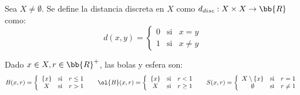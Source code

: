 \begin{ejemplo}
    Sea $X\neq \emptyset$. Se define la distancia discreta en $X$ como $d_{disc}:X\times X\to \bb{R}$ como:
    \begin{equation*}
        d(x,y)=\left\{
            \begin{array}{ccc}
                0 & \text{si} & x=y \\
                1 & \text{si} & x\neq y
            \end{array}
        \right.
    \end{equation*}

    Dado $x\in X, r\in \bb{R}^+$, las bolas y esfera son:
    \begin{equation*}
        B(x,r)=\left\{
            \begin{array}{ccc}
                \{x\} & \text{si} & r \leq 1 \\
                X & \text{si} & r > 1
            \end{array}
        \right.
        \hspace{0.5cm}
        \ol{B}(x,r)=\left\{
            \begin{array}{ccc}
                \{x\} & \text{si} & r < 1 \\
                X & \text{si} & r \geq 1
            \end{array}
        \right.
        \hspace{0.5cm}
        S(x,r)=\left\{
            \begin{array}{ccc}
                X\setminus \{x\} & \text{si} & r = 1 \\
                \emptyset & \text{si} & r \neq 1
            \end{array}
        \right.
    \end{equation*}
\end{ejemplo}

